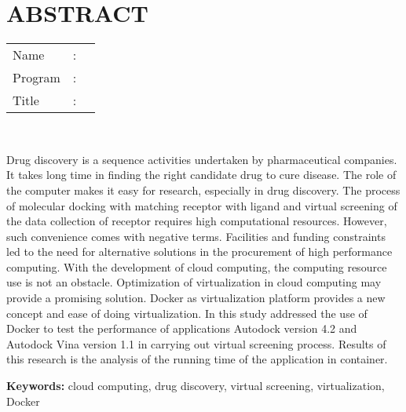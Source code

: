 %
%
%

\chapter*{ABSTRACT}

\vspace*{0.2cm}

\noindent \begin{tabular}{l l p{11.0cm}}
	Name&: & \penulis \\
	Program&: & \program \\
	Title&: & \judulInggris \\
\end{tabular} \\ 

\vspace*{0.5cm}

\noindent Drug discovery is a sequence activities undertaken by pharmaceutical companies. It takes long time in finding the right candidate  drug to cure disease. The role of the computer makes it easy for research, especially in drug discovery. The process of molecular docking with  matching receptor with ligand and virtual screening of the data collection of receptor requires high computational resources. However, such convenience comes with negative terms. Facilities and funding constraints led to the need for alternative solutions in the procurement of high performance computing. With the development of cloud computing, the computing resource use is not an obstacle. Optimization of virtualization in cloud computing may provide a promising solution. Docker as virtualization platform provides a new concept and ease of doing virtualization. In this study addressed the use of Docker to test the performance of applications Autodock version 4.2 and Autodock Vina version 1.1 in carrying out virtual screening process. Results of this research is the analysis of the running time of the application in container.

\vspace*{0.2cm}

\noindent \textbf{Keywords:} cloud computing, drug discovery, virtual screening, virtualization, Docker
\newpage